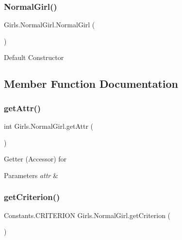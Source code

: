 \subsubsection{\texorpdfstring{Normal\+Girl()}{NormalGirl()}\hspace{0.1cm}{\footnotesize\ttfamily [2/2]}}
{\footnotesize\ttfamily Girls.\+Normal\+Girl.\+Normal\+Girl (\begin{DoxyParamCaption}{ }\end{DoxyParamCaption})\hspace{0.3cm}{\ttfamily [inline]}}

Default Constructor 

\subsection{Member Function Documentation}
\mbox{\label{class_girls_1_1_normal_girl_a9b1a2f8b3c04e4222a02b749e2cd2195}} 
\subsubsection{\texorpdfstring{get\+Attr()}{getAttr()}}
{\footnotesize\ttfamily int Girls.\+Normal\+Girl.\+get\+Attr (\begin{DoxyParamCaption}{ }\end{DoxyParamCaption})\hspace{0.3cm}{\ttfamily [inline]}}

Getter (Accessor) for 
\begin{DoxyParams}{Parameters}
{\em attr} & \\
\hline
\end{DoxyParams}
\mbox{\label{class_girls_1_1_normal_girl_a760691e9f9d70d594e2051b380ac63cd}} 
\subsubsection{\texorpdfstring{get\+Criterion()}{getCriterion()}}
{\footnotesize\ttfamily Constants.\+C\+R\+I\+T\+E\+R\+I\+ON Girls.\+Normal\+Girl.\+get\+Criterion (\begin{DoxyParamCaption}{ }\end{DoxyParamCaption})\hspace{0.3cm}{\ttfamily [inline]}}

